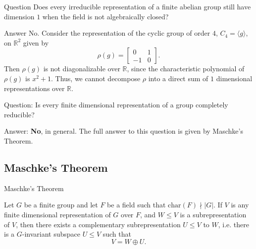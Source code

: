\begin{frame}
\begin{block}{Question}
Does every irreducible representation of a finite abelian group still have dimension $1$ when the field is not algebraically closed?
\end{block}
\pause
\begin{block}{Answer}
No.  Consider the representation of the cyclic group of order $4$, $C_4 = \langle g \rangle$, on $\mathbb{R}^2$ given by \[ \rho(g) = \begin{bmatrix}
0 & 1 \\ -1 & 0
\end{bmatrix}. \]
Then $\rho(g)$ is not diagonalizable over $\mathbb{R}$, since the characteristic polynomial of $\rho(g)$ is $x^2 +1$.  Thus, we cannot decompose $\rho$ into a direct sum of $1$ dimensional representations over $\mathbb{R}$.
\end{block}
\end{frame}


\begin{frame}
\begin{block}{Question:}
Is every finite dimensional representation of a group completely reducible? 
\end{block}
\begin{block}{Answer:}
\textbf{No}, in general.  The full answer to this question is given by Maschke's Theorem.
\end{block}
\end{frame}

\subsection{Maschke's Theorem}
\begin{frame}{Maschke's Theorem}
\begin{theorem}
Let $G$ be a finite group and let $F$ be a field such that $\text{char}(F) \nmid |G|$.  If $V$ is any finite dimensional representation of $G$ over $F$, and $W \leq V$ is a subrepresentation of $V$, then there exists a complementary subrepresentation $U \leq V$ to $W$, i.e. there is  a $G$-invariant subspace $U \leq V$ such that 
\[ V = W \oplus U. \]
\end{theorem}
\end{frame}


